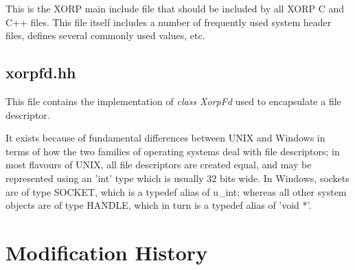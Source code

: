 \documentclass[11pt]{article}
\begin{document}
This is the XORP main include file that should be included by all XORP
C and C++ files. This file itself includes a number of frequently used system
header files, defines several commonly used values, etc.

\subsection{xorpfd.hh}

This file contains the implementation of \emph{class XorpFd} used to
encapsulate a file descriptor.

It exists because of fundamental differences between UNIX and Windows
in terms of how the two families of operating systems deal with file
descriptors; in most flavours of UNIX, all file descriptors are
created equal, and may be represented using an 'int' type which is
usually 32 bits wide. In Windows, sockets are of type SOCKET, which
is a typedef alias of u\_int; whereas all other system objects are
of type HANDLE, which in turn is a typedef alias of 'void *'.


\appendix
\section{Modification History}
\end{document}
